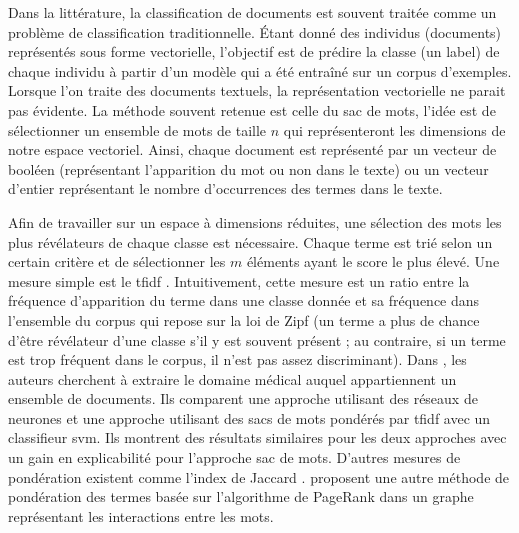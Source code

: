 Dans la littérature, la classification de documents est souvent traitée comme un problème de classification traditionnelle.
Étant donné des individus (documents) représentés sous forme vectorielle, l'objectif est de prédire la classe (un label) de chaque individu à partir d'un modèle qui a été entraîné sur un corpus d'exemples.
Lorsque l'on traite des documents textuels, la représentation vectorielle ne parait pas évidente.
La méthode souvent retenue est celle du sac de mots, l'idée est de sélectionner un ensemble de mots de taille $n$ qui représenteront les dimensions de notre espace vectoriel.
Ainsi, chaque document est représenté par un vecteur de booléen (représentant l'apparition du mot ou non dans le texte) ou un vecteur d'entier représentant le nombre d'occurrences des termes dans le texte.

Afin de travailler sur un espace à dimensions réduites, une sélection des mots les plus révélateurs de chaque classe est nécessaire.
Chaque terme est trié selon un certain critère et de sélectionner les $m$ éléments ayant le score le plus élevé.
Une mesure simple est le \gls{tfidf} \cite{sparckjonesStatisticalInterpretationTerm1972}.
Intuitivement, cette mesure est un ratio entre la fréquence d'apparition du terme dans une classe donnée et sa fréquence dans l'ensemble du corpus qui repose sur la loi de Zipf \cite{zipfPsychobiologyLanguage1935} (un terme a plus de chance d'être révélateur d'une classe s'il y est souvent présent ; au contraire, si un terme est trop fréquent dans le corpus, il n'est pas assez discriminant).
Dans \cite{wengMedicalSubdomainClassification2017}, les auteurs cherchent à extraire le domaine médical auquel appartiennent un ensemble de documents.
Ils comparent une approche utilisant des réseaux de neurones et une approche utilisant des sacs de mots pondérés par \gls{tfidf} avec un classifieur \gls{svm}.
Ils montrent des résultats similaires pour les deux approches avec un gain en explicabilité pour l'approche sac de mots.
D'autres mesures de pondération existent comme l'index de Jaccard \cite{jaccardDistributionFloreAlpine1901}.
\cite{mihalceaTextrankBringingOrder2004} proposent une autre méthode de pondération des termes basée sur l'algorithme de PageRank \cite{brinAnatomyLargescaleHypertextual1998} dans un graphe représentant les interactions entre les mots.

